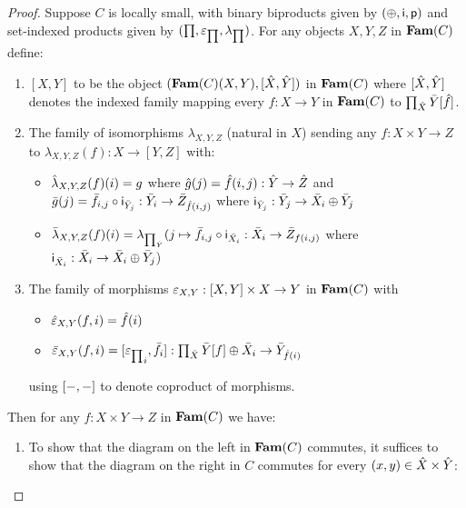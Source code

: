 \begin{proof}
Suppose $C$ is locally small, with binary biproducts given by $(\oplus,\mathsf{i},\mathsf{p})$ and set-indexed products
given by $(\prod,\varepsilon_{\prod},\lambda_{\prod})$. For any objects $X, Y, Z$ in $\mathbf{Fam}(C)$ define:

\begin{enumerate}
\item $[X, Y]$ to be the object $(\mathbf{Fam}(C)(X,Y),[\hat{X}, \hat{Y}])$ in $\mathbf{Fam}(C)$ where $[\hat{X}, \hat{Y}]$
denotes the indexed family mapping every $f: X \to Y$ in $\mathbf{Fam}(C)$ to
$\prod_{\hat{X}}\bar{Y}[\hat{f}]$.
\item The family of isomorphisms $\lambda_{X,Y,Z}$ (natural in $X$) sending any $f: X \times Y \to Z$ to
$\lambda_{X,Y,Z}(f): X \to [Y, Z]$ with:
\begin{itemize}
\item $\hat{\lambda}_{X,Y,Z}(f)(i) = g$ where $\hat{g}(j) = \hat{f}(i, j): \hat{Y} \to \hat{Z}$ and
$\bar{g}(j) = \bar{f}_{i,j} \circ \mathsf{i}_{\bar{Y}_j}: \bar{Y}_i \to \bar{Z}_{\hat{f}(i, j)}$ where
$\mathsf{i}_{\bar{Y}_j}: \bar{Y}_j \to \bar{X}_i \oplus \bar{Y}_j$
\item $\bar{\lambda}_{X,Y,Z}(f)(i) = \lambda_{\prod_{\hat{Y}}}(j \mapsto \bar{f}_{i, j} \circ
\mathsf{i}_{\bar{X}_i}: \bar{X}_i \to \bar{Z}_{f(i,j)}$ where $\mathsf{i}_{\bar{X}_i}: \bar{X}_i \to \bar{X}_i
\oplus \bar{Y}_j$)
\end{itemize}
\item The family of morphisms $\varepsilon_{X,Y}: [X, Y] \times X \to Y$ in $\mathbf{Fam}(C)$ with
\begin{itemize}
\item $\hat{\varepsilon}_{X,Y}(f, i) = \hat{f}(i)$
\item $\bar{\varepsilon}_{X,Y}(f, i) = [{\varepsilon_{\prod}}_i, \bar{f}_i]:
\prod_{\hat{X}}\bar{Y}[f] \oplus \bar{X}_i \to \bar{Y}_{\hat{f}(i)}$
\end{itemize}
using $[-, -]$ to denote coproduct of morphisms.
\end{enumerate}
Then for any $f: X \times Y \to Z$ in $\mathbf{Fam}(C)$ we have:
\begin{enumerate}
\item To show that the diagram on the left in $\mathbf{Fam}(C)$ commutes, it suffices to show that the diagram on the
right in $C$ commutes for every $(x, y) \in \hat{X} \times \hat{Y}$:


\end{enumerate}
\end{proof}
